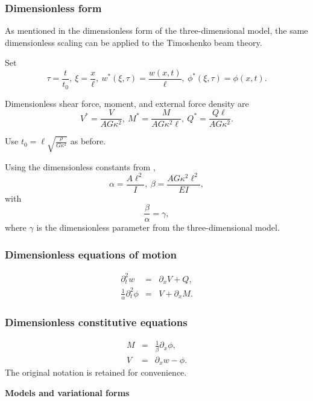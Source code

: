 		\subsubsection*{Dimensionless form}\label{sssec:1D_Model:DimensionlessForm}
			As mentioned in the dimensionless form of the three-dimensional model, the same dimensionless scaling can be applied to the Timoshenko beam theory.

			Set \[\tau = \frac{t}{t_0},\ \xi = \frac{x}{\ell},\ w^*(\xi,\tau) = \frac{w(x,t)}{\ell},\ \phi^*(\xi, \tau) = \phi(x,t).\]

			Dimensionless shear force, moment, and external force density are \[V^{*} = \frac{V}{AG\kappa^2},\ M^{*} = \frac{M}{A G\kappa^2 \ell},\ Q^* = \frac{Q\ell}{A G\kappa^2}.\]

			Use $\displaystyle t_0 = \ell\sqrt{\frac{\rho}{G\kappa^2}}$ as before.

			Using the dimensionless constants from \cite{LVV09}, 
			\[\alpha = \frac{A \ell^2}{I},\ \beta =\frac{AG\kappa^2 \ell^2}{EI},\]
			with \[\frac{\beta}{\alpha} = \gamma,\] where $\gamma$ is the dimensionless parameter from the three-dimensional model.

		\subsubsection*{Dimensionless equations of motion}\label{sssec:1D_Model:DimensionlessEquationsOfMotion}
			\begin{eqnarray}
				\partial_{t}^{2} w &=& \partial_{x}V + Q, \label{eq:1D_Model:EquationOfMotion1D}\\
				\frac{1}{\alpha} \partial_{t}^{2} \phi &=& V + \partial_{x}M.\label{eq:1D_Model:EquationOfMotion2D}
			\end{eqnarray}
		\subsubsection*{Dimensionless constitutive equations}\label{sssec:1D_Model:DimensionlessConstitutiveEquations}
			\begin{eqnarray}
				M &=& \frac{1}{\beta}\partial_x \phi, \label{eq:1D_Model:ConstitutiveEquations1D}\\
				V &=& \partial_x w-\phi. \label{eq:1D_Model:ConstitutiveEquations2D}
			\end{eqnarray}
		The original notation is retained for convenience.

		\textbf{Models and variational forms}
